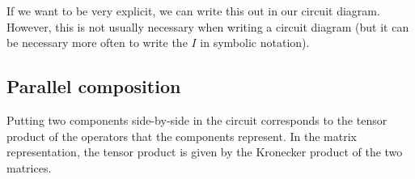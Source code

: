 \documentclass[runningheads]{llncs}
\begin{document}
If we want to be very explicit, we can write this out in our circuit diagram. However, this is not usually necessary when writing a circuit diagram (but it can be necessary more often to write the $I$ in symbolic notation).
\\

\begin{figure}[H]
  \centering
\begin{minipage}{.5\textwidth}
  \centering
\end{minipage}
\end{figure}

\subsection{Parallel composition}

Putting two components side-by-side in the circuit corresponds to the tensor product of the operators that the components represent. In
the matrix representation, the tensor product is given by the Kronecker product of the two matrices.
\end{document}
